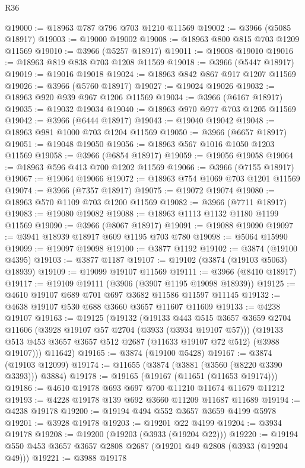 \begin{lexlean}{R36}
\begin{coremodule}
@19000 := @18963 @787 @796 @703 @1210 @11569
@19002 := @3966 (@5085 @18917)
@19003 := @19000 @19002
@19008 := @18963 @800 @815 @703 @1209 @11569
@19010 := @3966 (@5257 @18917)
@19011 := @19008 @19010
@19016 := @18963 @819 @838 @703 @1208 @11569
@19018 := @3966 (@5447 @18917)
@19019 := @19016 @19018
@19024 := @18963 @842 @867 @917 @1207 @11569
@19026 := @3966 (@5760 @18917)
@19027 := @19024 @19026
@19032 := @18963 @920 @939 @967 @1206 @11569
@19034 := @3966 (@6167 @18917)
@19035 := @19032 @19034
@19040 := @18963 @970 @977 @703 @1205 @11569
@19042 := @3966 (@6444 @18917)
@19043 := @19040 @19042
@19048 := @18963 @981 @1000 @703 @1204 @11569
@19050 := @3966 (@6657 @18917)
@19051 := @19048 @19050
@19056 := @18963 @567 @1016 @1050 @1203 @11569
@19058 := @3966 (@6854 @18917)
@19059 := @19056 @19058
@19064 := @18963 @596 @413 @700 @1202 @11569
@19066 := @3966 (@7155 @18917)
@19067 := @19064 @19066
@19072 := @18963 @754 @1069 @703 @1201 @11569
@19074 := @3966 (@7357 @18917)
@19075 := @19072 @19074
@19080 := @18963 @570 @1109 @703 @1200 @11569
@19082 := @3966 (@7711 @18917)
@19083 := @19080 @19082
@19088 := @18963 @1113 @1132 @1180 @1199 @11569
@19090 := @3966 (@8067 @18917)
@19091 := @19088 @19090
@19097 := @3941 @18939 @18917 @609 @1195 @703 @780
@19098 := @5064 @15990
@19099 := @19097 @19098
@19100 := @3877 @1192
@19102 := @3874 (@19100 @4395)
@19103 := @3877 @1187
@19107 := @19102 (@3874 (@19103 @5063) @18939)
@19109 := @19099 @19107 @11569
@19111 := @3966 (@8410 @18917)
@19117 := @19109 @19111 (@3906 (@3907 @1195 @19098 @18939))
@19125 := @4610 @19107 @689 @701 @697 @3682 @11586 @11597 @11145
@19132 := @4638 @19107 @530 @688 @3660 @3657 @11607 @11609
@19133 := @4238 @19107
@19163 := @19125
    (@19132
      (@19133
        @443
        @515
        @3657
        @3659
        @2704
        @11606
        (@3928 @19107 @57 @2704 (@3933 (@3934 @19107 @57)))
        (@19133 @513 @453 @3657 @3657 @512 @2687 (@11633 @19107 @72 @512) (@3988 @19107)))
      @11642)
@19165 := @3874 (@19100 @5428)
@19167 := @3874 (@19103 @12099)
@19174 := @11655 (@3874 (@3881 (@3560 (@8220 @3390 @3393))) @3884)
@19178 := @19165 (@19167 (@11651 (@11653 @19174)))
@19186 := @4610 @19178 @693 @697 @700 @11210 @11674 @11679 @11212
@19193 := @4228 @19178 @139 @692 @3660 @11209 @11687 @11689
@19194 := @4238 @19178
@19200 := @19194 @494 @552 @3657 @3659 @4199 @5978
@19201 := @3928 @19178
@19203 := @19201 @22 @4199
@19204 := @3934 @19178
@19208 := @19200 (@19203 (@3933 (@19204 @22)))
@19220 := @19194 @550 @453 @3657 @3657 @2808 @2687 (@19201 @49 @2808 (@3933 (@19204 @49)))
@19221 := @3988 @19178

\end{coremodule}
\end{lexlean}
